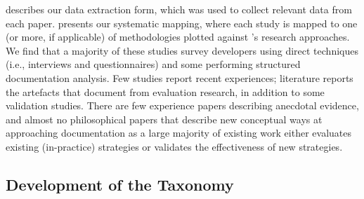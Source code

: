  describes our data extraction form, which was used to collect relevant data from each paper.  presents our systematic mapping, where each study is mapped to one (or more, if applicable) of methodologies plotted against \citeauthor{Wieringa:2006vd}'s research approaches. We find that a majority of these studies survey developers using direct techniques (i.e., interviews and questionnaires) and some performing structured documentation analysis. Few studies report recent experiences; literature reports the artefacts that document  from evaluation research, in addition to some validation studies. There are few experience papers describing anecdotal evidence, and almost no philosophical papers that describe new conceptual ways at approaching  documentation as a large majority of existing work either evaluates existing (in-practice) strategies or validates the effectiveness of new strategies.

\begin{table}[tb]
  \caption[Data extraction form used for the systematic mapping study]{Data extraction form}
  \label{tse2020:tab:extraction}
  \centering
\end{table}

\subsection{Development of the Taxonomy}
\label{tse2020:sec:method:taxonomy-development}


